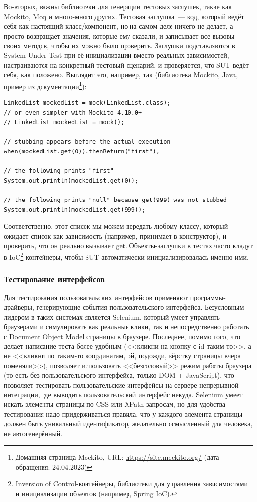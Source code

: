 \documentclass{../../text-style}
\begin{document}
Во-вторых, важны библиотеки для генерации тестовых заглушек, такие как Mockito, Moq и много-много других. Тестовая заглушка~--- код, который ведёт себя как настоящий класс/компонент, но на самом деле ничего не делает, а просто возвращает значения, которые ему сказали, и записывает все вызовы своих методов, чтобы их можно было проверить. Заглушки подставляются в System Under Test при её инициализации вместо реальных зависимостей, настраиваются на конкретный тестовый сценарий, и проверяется, что SUT ведёт себя, как положено. Выглядит это, например, так (библиотека Mockito, Java, пример из документации\footnote{Домашняя страница Mockito, URL: \url{https://site.mockito.org/} (дата обращения: 24.04.2023)}):

\begin{verbatim}
LinkedList mockedList = mock(LinkedList.class);
// or even simpler with Mockito 4.10.0+
// LinkedList mockedList = mock();

// stubbing appears before the actual execution
when(mockedList.get(0)).thenReturn("first");

// the following prints "first"
System.out.println(mockedList.get(0));

// the following prints "null" because get(999) was not stubbed
System.out.println(mockedList.get(999));
\end{verbatim}

Соответственно, этот список мы можем передать любому классу, который ожидает список как зависимость (например, принимает в конструктор), и проверить, что он реально вызывает get. Объекты-заглушки в тестах часто кладут в IoC\footnote{Inversion of Control-контейнеры, библиотеки для управления зависимостями и инициализации объектов (например, Spring IoC).}-контейнеры, чтобы SUT автоматически инициализировалась именно ими.

\subsubsection{Тестирование интерфейсов}

Для тестирования пользовательских интерфейсов применяют программы-драйверы, генерирующие события пользовательского интерфейса. Безусловным лидером в таких системах является Selenium, который умеет управлять браузерами и симулировать как реальные клики, так и непосредственно работать с Document Object Model страницы в браузере. Последнее, помимо того, что делает написание теста более удобным (<<кликни на кнопку с id таким-то>>, а не <<кликни по таким-то координатам, ой, подожди, вёрстку страницы вчера поменяли>>), позволяет использовать <<безголовый>> режим работы браузера (то есть без пользовательского интерфейса, только DOM + JavaScript), что позволяет тестировать пользовательские интерфейсы на сервере непрерывной интеграции, где выводить пользовательский интерфейс некуда. Selenium умеет искать элементы страницы по CSS или XPath-запросам, но для удобства тестирования надо придерживаться правила, что у каждого элемента страницы должен быть уникальный идентификатор, желательно осмысленный для человека, не автогенерённый.
\end{document}
